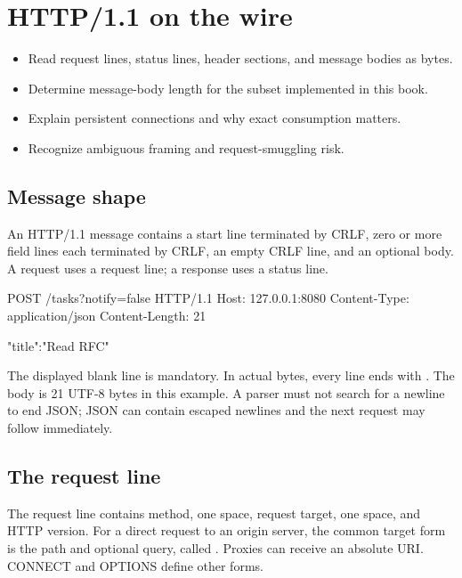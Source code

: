 \chapter{HTTP/1.1 on the wire}

\begin{objectives}
\begin{itemize}
  \item Read request lines, status lines, header sections, and message bodies as bytes.
  \item Determine message-body length for the subset implemented in this book.
  \item Explain persistent connections and why exact consumption matters.
  \item Recognize ambiguous framing and request-smuggling risk.
\end{itemize}
\end{objectives}

\section{Message shape}

An HTTP/1.1 message contains a start line terminated by CRLF, zero or more field
lines each terminated by CRLF, an empty CRLF line, and an optional body. A
request uses a request line; a response uses a status line.

\begin{wiremessage}
POST /tasks?notify=false HTTP/1.1
Host: 127.0.0.1:8080
Content-Type: application/json
Content-Length: 21

{"title":"Read RFC"}
\end{wiremessage}

The displayed blank line is mandatory. In actual bytes, every line ends with
\code{\\r\\n}. The body is 21 UTF-8 bytes in this example. A parser must not
search for a newline to end JSON; JSON can contain escaped newlines and the next
request may follow immediately.

\section{The request line}

The request line contains method, one space, request target, one space, and HTTP
version. For a direct request to an origin server, the common target form is the
path and optional query, called . Proxies can receive an
absolute URI. CONNECT and OPTIONS define other forms.

